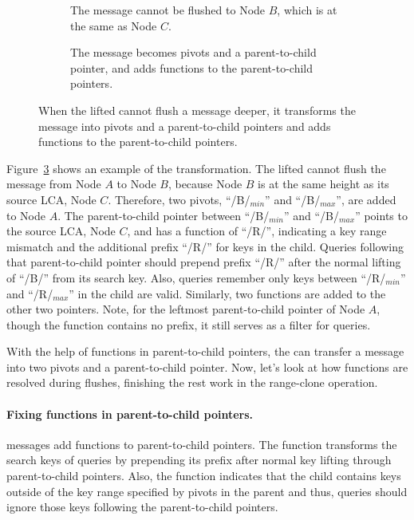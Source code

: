 \begin{figure}
    \begin{subfigure}{\textwidth}
        \centering
        
        \caption{\label{subfig:spvt-1} The \goto message cannot be flushed to
            Node $B$, which is at the same as Node $C$.}
    \end{subfigure}
    \begin{subfigure}{\textwidth}
        \centering
        
        \caption{\label{subfig:spvt-2} The \goto message becomes pivots and a
            parent-to-child pointer, and adds \xf functions to the parent-to-child pointers.}
    \end{subfigure}
    \caption[Transform a \goto message into pivots and a parent-to-child pointer]{\label{fig:spvt}
        When the lifted \bedag cannot flush a \goto message deeper, it
        transforms the \goto message into pivots and a parent-to-child pointers
        and adds \xf functions to the parent-to-child pointers.}
\end{figure}

Figure~\ref{fig:spvt} shows an example of the transformation.
The lifted \bedag cannot flush the \goto message from Node $A$ to Node $B$,
because Node $B$ is at the same height as its source LCA, Node $C$.
Therefore, two pivots, ``/B/$_{min}$'' and ``/B/$_{max}$'', are added to Node $A$.
The parent-to-child pointer between ``/B/$_{min}$'' and ``/B/$_{max}$'' points
to the source LCA, Node $C$, and has a \xf function of ``/R/'', indicating a
key range mismatch and the additional prefix ``/R/'' for keys in the child.
Queries following that parent-to-child pointer should prepend prefix ``/R/''
after the normal lifting of ``/B/'' from its search key.
Also, queries remember only keys between ``/R/$_{min}$'' and ``/R/$_{max}$'' in
the child are valid.
Similarly, two \xf functions are added to the other two pointers.
Note, for the leftmost parent-to-child pointer of Node $A$, though the \xf
function contains no prefix, it still serves as a filter for queries.

With the help of \xf functions in parent-to-child pointers,
the \bedag can transfer a \goto message into two pivots and a parent-to-child
pointer.
Now, let's look at how \xf functions are resolved during flushes,
finishing the rest work in the range-clone operation.

\paragraph{Fixing \xf functions in parent-to-child pointers.}
\goto messages add \xf functions to parent-to-child pointers.
The \xf function transforms the search keys of queries by prepending its prefix
after normal key lifting through parent-to-child pointers.
Also, the \xf function indicates that
the child contains keys outside of the key range
specified by pivots in the parent and
thus, queries should ignore those keys following
the parent-to-child pointers.

